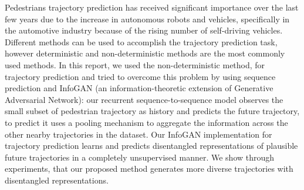 Pedestrians trajectory prediction has received significant importance over the last few years due to the increase in autonomous robots and vehicles, specifically in the automotive industry because of the rising number of self-driving vehicles. Different methods can be used to accomplish the trajectory prediction task, however deterministic and non-deterministic methods are the most commonly used methods. In this report, we used the non-deterministic method, for trajectory prediction and tried to overcome this problem by using sequence prediction and InfoGAN (an information-theoretic extension of Generative Adversarial Network): our recurrent sequence-to-sequence model observes the small subset of pedestrian trajectory as history and predicts the future trajectory, to predict it uses a pooling mechanism to aggregate the information across the other nearby trajectories in the dataset. Our InfoGAN implementation for trajectory prediction learns and predicts disentangled representations of plausible future trajectories in a completely unsupervised manner. We show through experiments, that our proposed method generates more diverse trajectories with disentangled representations.